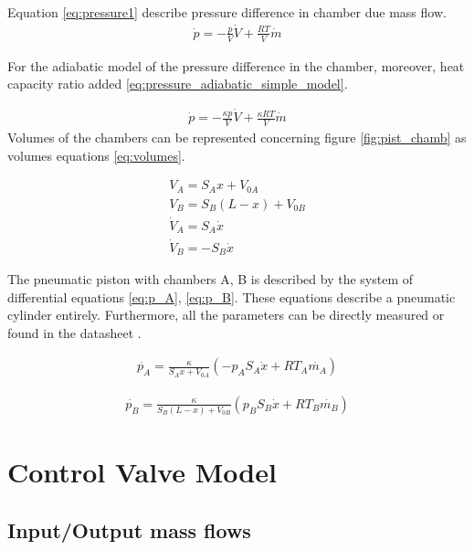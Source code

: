 Equation \ref{eq:pressure1} describe pressure difference in chamber due
mass flow.
\begin{align}
    \dot{p} = - \frac{p}{V}\dot{V} + \frac{RT}{V}\dot{m}
    \label{eq:pressure1}
\end{align}


For the adiabatic model of the pressure difference in the chamber,
moreover, heat capacity ratio added
\ref{eq:pressure_adiabatic_simple_model}.

\begin{align}
    \dot{p} = - \frac{\kappa p}{V}\dot{V} + \frac{\kappa RT}{V}\dot{m}
    \label{eq:pressure_adiabatic_simple_model}
\end{align}
Volumes of the chambers can be represented concerning figure
\ref{fig:pist_chamb} as volumes equations \ref{eq:volumes}.

\begin{align}
    V_A = S_A x + V_{0A} \\
    V_B = S_B (L-x) + V_{0B} \\
    \dot{V}_A = S_A \dot{x} \\
    \dot{V}_B = - S_B \dot{x}
    \label{eq:volumes}
\end{align}

The pneumatic piston with chambers A, B is described by the system of
differential equations \ref{eq:p_A}, \ref{eq:p_B}. These equations describe a pneumatic
cylinder entirely. Furthermore, all the parameters can be directly measured
or found in the datasheet \cite{}.

\begin{align}
    \dot{p_A} = \frac{\kappa}{S_A x + V_{0A}} \left(- p_A S_A\dot{x} +
    RT_A\dot{m_A} \right)
    \label{eq:p_A}
\end{align}

\begin{align}
    \dot{p_B} = \frac{\kappa}{S_B (L-x) + V_{0B}} \left(p_B S_B\dot{x} +
    RT_B\dot{m_B} \right)
    \label{eq:p_B}
\end{align}


\section{Control Valve Model}

\subsection{Input/Output mass flows}

